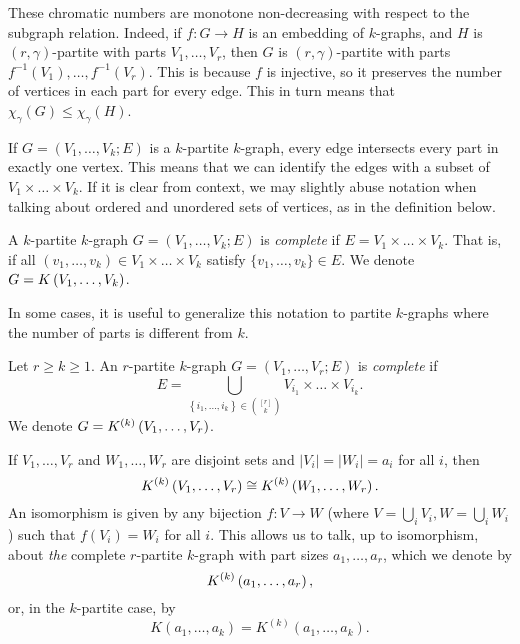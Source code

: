 \begin{remark}
    These chromatic numbers are monotone non-decreasing with respect to the subgraph relation.
    Indeed, if $f: G \to H$ is an embedding of $k$-graphs,
    and $H$ is $(r, \gamma)$-partite with parts $V_1, \dots, V_r$,
    then $G$ is $(r, \gamma)$-partite with parts $f^{-1}(V_1), \dots, f^{-1}(V_r)$.
    This is because $f$ is injective, so it preserves the number of vertices in each part for every edge.
    This in turn means that $\chi_{\gamma}(G) \leq \chi_{\gamma}(H)$.
\end{remark}

If $G = (V_1, \dots, V_k; E)$ is a $k$-partite $k$-graph,
every edge intersects every part in exactly one vertex.
This means that we can identify the edges with a subset of $ V_1 \times \dots \times V_k$.
If it is clear from context, we may slightly abuse notation when talking about ordered and
unordered sets of vertices, as in the definition below.


\begin{definition} \label{def:complete_kpartite}
    A $k$-partite $k$-graph $G = (V_1, \dots, V_k; E)$ is \emph{complete}
    if $E = V_1 \times \dots \times V_k$.
    That is, if all $(v_1, \dots, v_k) \in V_1 \times \dots \times V_k$
    satisfy $\{v_1, \dots, v_k\} \in E$.
    We denote $G = K\left(V_1, \dots, V_k\right)$.
\end{definition}

In some cases, it is useful to generalize this notation to partite $k$-graphs
where the number of parts is different from $k$.

\begin{definition}
    Let $r \geq k \geq 1$.
    An $r$-partite $k$-graph $G = (V_1, \dots, V_r; E)$ is \emph{complete} if
    \[
        E = \bigcup_{\left\{i_1, \dots, i_k \right\} \in \binom{[r]}{k}} V_{i_1} \times \dots \times V_{i_k}.
    \]
    We denote $G = K^{(k)}\left(V_1, \dots, V_r\right)$.

\end{definition}

If $V_1, \dots, V_r$ and $W_1, \dots, W_r$ are disjoint sets
and $|V_i| = |W_i| = a_i$ for all $i$, then
\[
    K^{(k)}\left(V_1, \dots, V_r\right) \cong K^{(k)}\left(W_1, \dots, W_r\right).
\]
An isomorphism is given by any bijection $f: V \to W$ (where $V=\bigcup_i V_i, W=\bigcup_i W_i$)
such that $f(V_i) = W_i$ for all $i$.
This allows us to talk, up to isomorphism, about \emph{the} complete $r$-partite $k$-graph
with part sizes $a_1, \dots, a_r$, which we denote by
\[
    K^{(k)}\left(a_1, \dots, a_r\right),
\]
or, in the $k$-partite case, by
\[
    K(a_1, \dots, a_k) = K^{(k)}(a_1, \dots, a_k).
\]

